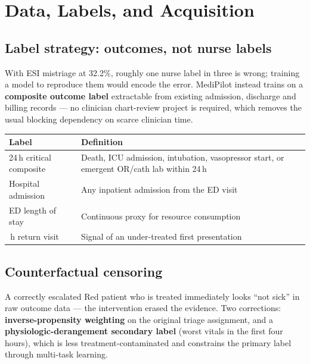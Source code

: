\documentclass[10pt,a4paper,twocolumn]{article}
\begin{document}
\section{Data, Labels, and Acquisition}
\label{sec:data}

\subsection{Label strategy: outcomes, not nurse labels}
With ESI mistriage at 32.2\%, roughly one nurse label in three is wrong; training a
model to reproduce them would encode the error. MediPilot instead trains on a
\textbf{composite outcome label} extractable from existing admission, discharge and
billing records --- no clinician chart-review project is required, which removes the
usual blocking dependency on scarce clinician time.

\begin{center}\footnotesize\sffamily
\begin{tabular}{@{}p{2.4cm}p{5.1cm}@{}}
\toprule
\rowcolor{AccPurple!10}
\textbf{Label} & \textbf{Definition}\\
\midrule
24\,h critical composite & Death, ICU admission, intubation, vasopressor start, or
emergent OR/cath lab within 24\,h\\
\addlinespace[2pt]
Hospital admission & Any inpatient admission from the ED visit\\
\addlinespace[2pt]
ED length of stay & Continuous proxy for resource consumption\\
\addlinespace[2pt]
72\,h return visit & Signal of an under-treated first presentation\\
\bottomrule
\end{tabular}
\end{center}

\subsection{Counterfactual censoring}
A correctly escalated Red patient who is treated immediately looks ``not sick'' in raw
outcome data --- the intervention erased the evidence. Two corrections:
\textbf{inverse-propensity weighting} on the original triage assignment, and a
\textbf{physiologic-derangement secondary label} (worst vitals in the first four
hours), which is less treatment-contaminated and constrains the primary label through
multi-task learning.
\end{document}
